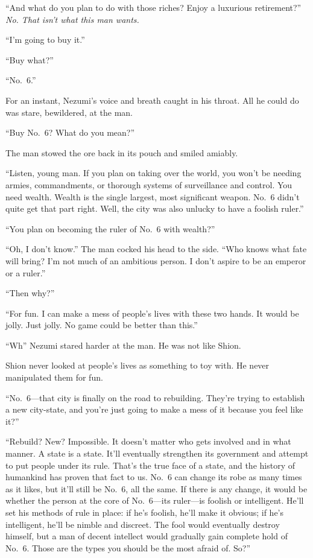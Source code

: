 ``And what do you plan to do with those riches? Enjoy a luxurious
retirement?'' \emph{No. That isn't what this man wants.}

``I'm going to buy it.''

``Buy what?''

``No.~6.''

For an instant, Nezumi's voice and breath caught in his throat. All he
could do was stare, bewildered, at the man.

``Buy No.~6? What do you mean?''

The man stowed the ore back in its pouch and smiled amiably.

``Listen, young man. If you plan on taking over the world, you won't be
needing armies, commandments, or thorough systems of surveillance and
control. You need wealth. Wealth is the single largest, most significant
weapon. No.~6 didn't quite get that part right. Well, the city was also
unlucky to have a foolish ruler.''

``You plan on becoming the ruler of No.~6 with wealth?''

``Oh, I don't know.'' The man cocked his head to the side. ``Who knows
what fate will bring? I'm not much of an ambitious person. I don't
aspire to be an emperor or a ruler.''

``Then why?''

``For fun. I can make a mess of people's lives with these two hands. It
would be jolly. Just jolly. No game could be better than this.''

``Wh\el '' Nezumi stared harder at the man. He was not like Shion.

Shion never looked at people's lives as something to toy with. He never
manipulated them for fun.

``No.~6---that city is finally on the road to rebuilding. They're trying
to establish a new city-state, and you're just going to make a mess of
it because you feel like it?''

``Rebuild? New? Impossible. It doesn't matter who gets involved and in
what manner. A state is a state. It'll eventually strengthen its
government and attempt to put people under its rule. That's the true
face of a state, and the history of humankind has proven that fact to
us. No.~6 can change its robe as many times as it likes, but it'll still
be No.~6, all the same. If there is any change, it would be whether the
person at the core of No.~6---its ruler---is foolish or intelligent. He'll
set his methods of rule in place: if he's foolish, he'll make it
obvious; if he's intelligent, he'll be nimble and discreet. The fool
would eventually destroy himself, but a man of decent intellect would
gradually gain complete hold of No.~6. Those are the types you should be
the most afraid of. So?''

